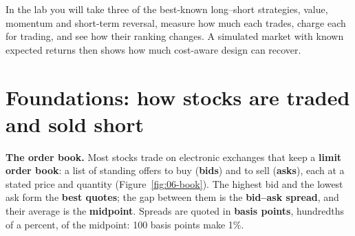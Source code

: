 In the lab you will take three of the best-known long--short strategies, value, momentum and short-term reversal, measure how much each trades, charge each for trading, and see how their ranking changes. A simulated market with known expected returns then shows how much cost-aware design can recover.

\section{Foundations: how stocks are traded and sold short}
\label{sec:06-foundations}

\textbf{The order book.} Most stocks trade on electronic exchanges that keep a \textbf{limit order book}: a list of standing offers to buy (\textbf{bids}) and to sell (\textbf{asks}), each at a stated price and quantity (Figure~\ref{fig:06-book}). The highest bid and the lowest ask form the \textbf{best quotes}; the gap between them is the \textbf{bid--ask spread}, and their average is the \textbf{midpoint}. Spreads are quoted in \textbf{basis points}, hundredths of a percent, of the midpoint: 100 basis points make 1\%.


